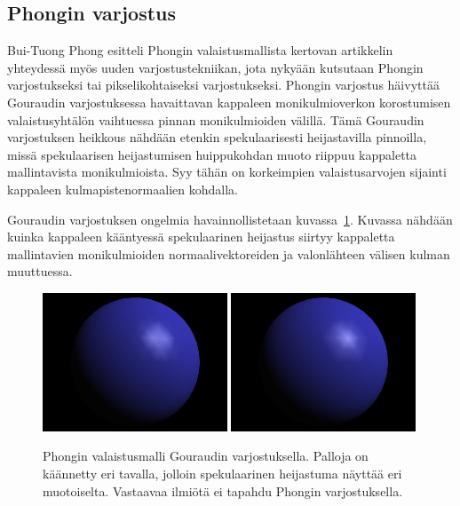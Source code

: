 \documentclass[finnish]{tktltiki2}
\theoremstyle{definition}
\theoremstyle{remark}
\begin{document}
\subsection{Phongin varjostus}
\label{subsec:Phongin_varjostus}
Bui-Tuong Phong esitteli Phongin valaistusmallista kertovan artikkelin~\cite{Phong} yhteydessä myös uuden varjostustekniikan, jota nykyään kutsutaan Phongin varjostukseksi tai pikselikohtaiseksi varjostukseksi. Phongin varjostus häivyttää Gouraudin varjostuksessa havaittavan kappaleen monikulmioverkon korostumisen valaistusyhtälön vaihtuessa pinnan monikulmioiden välillä. Tämä Gouraudin varjostuksen heikkous nähdään etenkin spekulaarisesti heijastavilla pinnoilla, missä spekulaarisen heijastumisen huippukohdan muoto riippuu kappaletta mallintavista monikulmioista. Syy tähän on korkeimpien valaistusarvojen sijainti kappaleen kulmapistenormaalien kohdalla.

Gouraudin varjostuksen ongelmia havainnollistetaan kuvassa~\ref{fig:Gouraud_ongelma}. Kuvassa nähdään kuinka kappaleen kääntyessä spekulaarinen heijastus siirtyy kappaletta mallintavien monikulmioiden normaalivektoreiden ja valonlähteen välisen kulman muuttuessa.
\begin{figure}[h]
\centering
\includegraphics[width=0.49\textwidth]{img/gouraud_spec_1_crop.png}
\includegraphics[width=0.49\textwidth]{img/gouraud_spec_2_crop.png}
\caption{Phongin valaistusmalli Gouraudin varjostuksella. Palloja on käännetty eri tavalla, jolloin spekulaarinen heijastuma näyttää eri muotoiselta. Vastaavaa ilmiötä ei tapahdu Phongin varjostuksella.}
\label{fig:Gouraud_ongelma}
\end{figure}
\end{document}
